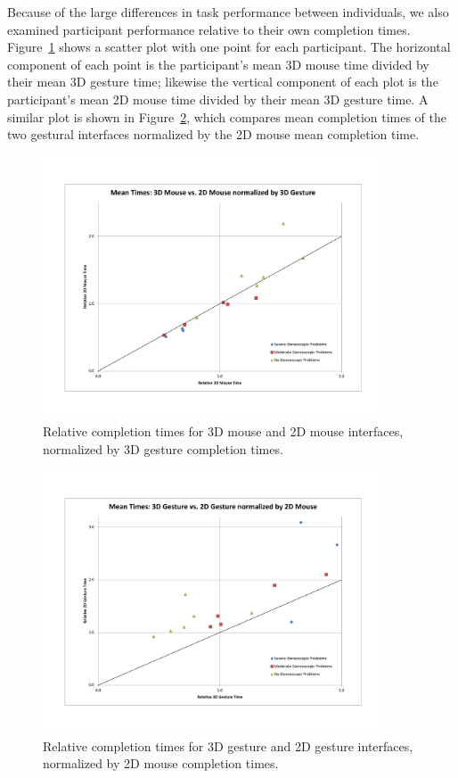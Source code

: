 \documentclass[pageno]{jpaper}
\begin{document}
Because of the large differences in task performance between individuals, we
also examined participant performance relative to their own completion times.
Figure~\ref{fig:mousevs3dg} shows a scatter plot with one point for each
participant. The horizontal component of each point is the participant's mean 3D
mouse time divided by their mean 3D gesture time; likewise the vertical
component of each plot is the participant's mean 2D mouse time divided by their
mean 3D gesture time. A similar plot is shown in Figure~\ref{fig:gesturevs2dm},
which compares mean completion times of the two gestural interfaces normalized
by the 2D mouse mean completion time.

\begin{figure}
\centering
\includegraphics[width=0.9\textwidth]{figures/f1.pdf}
\caption{Relative completion times for 3D mouse and 2D mouse interfaces,
normalized by 3D gesture completion times.}
\label{fig:mousevs3dg}
\end{figure}
\begin{figure}
\centering
\includegraphics[width=0.9\textwidth]{figures/f2.pdf}
\caption{Relative completion times for 3D gesture and 2D gesture interfaces,
normalized by 2D mouse completion times.}
\label{fig:gesturevs2dm}
\end{figure}
\end{document}
